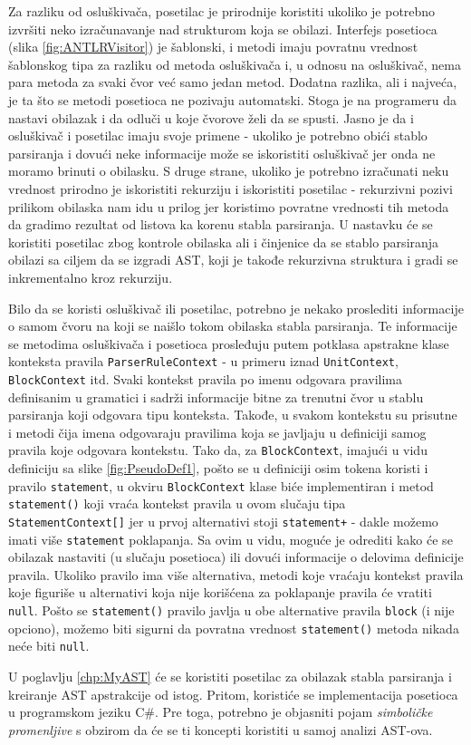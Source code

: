 Za razliku od osluškivača, posetilac je prirodnije koristiti ukoliko je potrebno izvršiti neko izračunavanje nad strukturom koja se obilazi. Interfejs posetioca (slika \ref{fig:ANTLRVisitor}) je šablonski, i metodi imaju povratnu vrednost šablonskog tipa za razliku od metoda osluškivača i, u odnosu na osluškivač, nema para metoda za svaki čvor već samo jedan metod. Dodatna razlika, ali i najveća, je ta što se metodi posetioca ne pozivaju automatski. Stoga je na programeru da nastavi obilazak i da odluči u koje čvorove želi da se spusti. Jasno je da i osluškivač i posetilac imaju svoje primene - ukoliko je potrebno obići stablo parsiranja i dovući neke informacije može se iskoristiti osluškivač jer onda ne moramo brinuti o obilasku. S druge strane, ukoliko je potrebno izračunati neku vrednost prirodno je iskoristiti rekurziju i iskoristiti posetilac - rekurzivni pozivi prilikom obilaska nam idu u prilog jer koristimo povratne vrednosti tih metoda da gradimo rezultat od listova ka korenu stabla parsiranja. U nastavku će se koristiti posetilac zbog kontrole obilaska ali i činjenice da se stablo parsiranja obilazi sa ciljem da se izgradi AST, koji je takođe rekurzivna struktura i gradi se inkrementalno kroz rekurziju.

Bilo da se koristi osluškivač ili posetilac, potrebno je nekako proslediti informacije o samom čvoru na koji se naišlo tokom obilaska stabla parsiranja. Te informacije se metodima osluškivača i posetioca prosleđuju putem potklasa apstrakne klase konteksta pravila \texttt{ParserRuleContext} - u primeru iznad \texttt{UnitContext}, \texttt{BlockContext} itd. Svaki kontekst pravila po imenu odgovara pravilima definisanim u gramatici i sadrži informacije bitne za trenutni čvor u stablu parsiranja koji odgovara tipu konteksta. Takođe, u svakom kontekstu su prisutne i metodi čija imena odgovaraju pravilima koja se javljaju u definiciji samog pravila koje odgovara kontekstu. Tako da, za \texttt{BlockContext}, imajući u vidu definiciju sa slike \ref{fig:PseudoDef1}, pošto se u definiciji osim tokena koristi i pravilo \texttt{statement}, u okviru \texttt{BlockContext} klase biće implementiran i metod \texttt{statement()} koji vraća kontekst pravila u ovom slučaju tipa \texttt{StatementContext[]} jer u prvoj alternativi stoji \texttt{statement+} - dakle možemo imati više \texttt{statement} poklapanja. Sa ovim u vidu, moguće je odrediti kako će se obilazak nastaviti (u slučaju posetioca) ili dovući informacije o delovima definicije pravila. Ukoliko pravilo ima više alternativa, metodi koje vraćaju kontekst pravila koje figuriše u alternativi koja nije korišćena za poklapanje pravila će vratiti \texttt{null}. Pošto se \texttt{statement()} pravilo javlja u obe alternative pravila \texttt{block} (i nije opciono), možemo biti sigurni da povratna vrednost \texttt{statement()} metoda nikada neće biti \texttt{null}.

U poglavlju \ref{chp:MyAST} će se koristiti posetilac za obilazak stabla parsiranja i kreiranje AST apstrakcije od istog. Pritom, koristiće se implementacija posetioca u programskom jeziku C\#. Pre toga, potrebno je objasniti pojam \emph{simboličke promenljive} s obzirom da će se ti koncepti koristiti u samoj analizi AST-ova.
